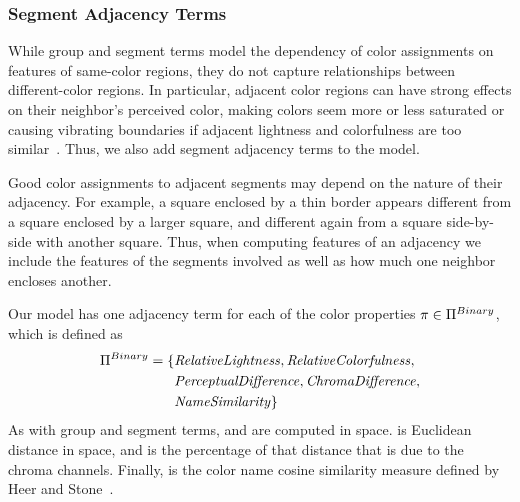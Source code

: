 
\subsubsection{Segment Adjacency Terms}
\label{sec:adjTerms}

While group and segment terms model the dependency of color assignments on features of same-color regions, they do not capture relationships between different-color regions. In particular, adjacent color regions can have strong effects on their neighbor's perceived color, making colors seem more or less saturated or causing vibrating boundaries if adjacent lightness and colorfulness are too similar~\cite{AlbersInteractionOfColor}. Thus, we also add segment adjacency terms to the model.

Good color assignments to adjacent segments may depend on the nature of their adjacency. For example, a square enclosed by a thin border appears different from a square enclosed by a larger square, and different again from a square side-by-side with another square. Thus, when computing features of an adjacency we include the features of the segments involved as well as how much one neighbor encloses another.~ 

Our model has one adjacency term for each of the color properties $ \pi \in \Pi^{Binary}$, which is defined as
\begin{align*}
\Pi^{Binary} = \{ &\text{\emph{RelativeLightness}}, \text{\emph{RelativeColorfulness}}, \\
                  &\text{\emph{PerceptualDifference}}, \text{\emph{ChromaDifference}}, \\
                  &\text{\emph{NameSimilarity}} \}
\end{align*}
As with group and segment terms,  and  are computed in \lab space.  is Euclidean distance in \lab space, and  is the percentage of that distance that is due to the chroma channels. Finally,  is the color name cosine similarity measure defined by Heer and Stone~.

